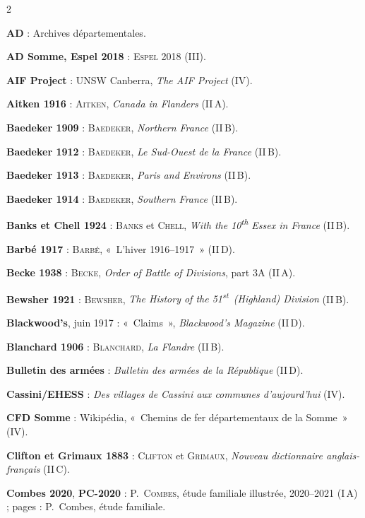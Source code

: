 \begin{multicols}{2}
\begin{biblist}
\item \textbf{AD} : Archives départementales.
\item \textbf{AD Somme, Espel 2018} : \textsc{Espel} 2018 (III).
\item \textbf{AIF Project} : UNSW Canberra, \textit{The AIF Project} (IV).
\item \textbf{Aitken 1916} : \textsc{Aitken}, \textit{Canada in Flanders} (II\,A).
\item \textbf{Baedeker 1909} : \textsc{Baedeker}, \textit{Northern France} (II\,B).
\item \textbf{Baedeker 1912} : \textsc{Baedeker}, \textit{Le Sud-Ouest de la France} (II\,B).
\item \textbf{Baedeker 1913} : \textsc{Baedeker}, \textit{Paris and Environs} (II\,B).
\item \textbf{Baedeker 1914} : \textsc{Baedeker}, \textit{Southern France} (II\,B).
\item \textbf{Banks et Chell 1924} : \textsc{Banks} et \textsc{Chell}, \textit{With the 10\textsuperscript{th} Essex in France} (II\,B).
\item \textbf{Barbé 1917} : \textsc{Barbé}, «~L'hiver 1916--1917~» (II\,D).
\item \textbf{Becke 1938} : \textsc{Becke}, \textit{Order of Battle of Divisions}, part 3A (II\,A).
\item \textbf{Bewsher 1921} : \textsc{Bewsher}, \textit{The History of the 51\textsuperscript{st}~(Highland) Division} (II\,B).
\item \textbf{Blackwood's}, juin 1917 : «~Claims~», \textit{Blackwood's Magazine} (II\,D).
\item \textbf{Blanchard 1906} : \textsc{Blanchard}, \textit{La Flandre} (II\,B).
\item \textbf{Bulletin des armées} : \textit{Bulletin des armées de la République} (II\,D).
\item \textbf{Cassini/EHESS} : \textit{Des villages de Cassini aux communes d'aujourd'hui} (IV).
\item \textbf{CFD Somme} : Wikipédia, «~Chemins de fer départementaux de la Somme~» (IV).
\item \textbf{Clifton et Grimaux 1883} : \textsc{Clifton} et \textsc{Grimaux}, \textit{Nouveau dictionnaire anglais-français} (II\,C).
\item \textbf{Combes 2020}, \textbf{PC-2020} : P.~\textsc{Combes}, étude familiale illustrée, 2020--2021 (I\,A) ; pages : P.~Combes, étude familiale.

\end{biblist}
\end{multicols}
